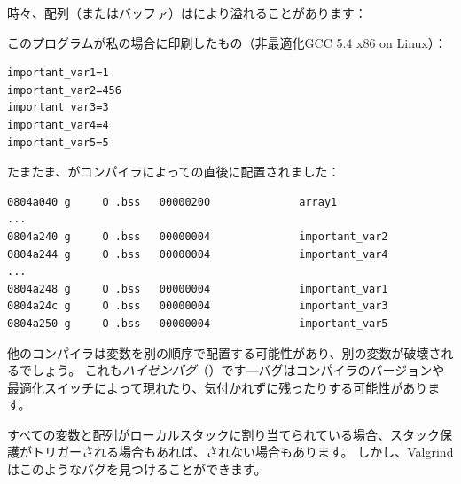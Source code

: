 
時々、配列（またはバッファ）はにより溢れることがあります：



このプログラムが私の場合に印刷したもの（非最適化GCC 5.4 x86 on Linux）：

\begin{lstlisting}
important_var1=1
important_var2=456
important_var3=3
important_var4=4
important_var5=5
\end{lstlisting}

たまたま、がコンパイラによっての直後に配置されました：

\begin{lstlisting}[caption=objdump -x]
0804a040 g     O .bss   00000200              array1
...
0804a240 g     O .bss   00000004              important_var2
0804a244 g     O .bss   00000004              important_var4
...
0804a248 g     O .bss   00000004              important_var1
0804a24c g     O .bss   00000004              important_var3
0804a250 g     O .bss   00000004              important_var5
\end{lstlisting}

他のコンパイラは変数を別の順序で配置する可能性があり、別の変数が破壊されるでしょう。
これも\textit{ハイゼンバグ}（）です---バグはコンパイラのバージョンや最適化スイッチによって現れたり、気付かれずに残ったりする可能性があります。

すべての変数と配列がローカルスタックに割り当てられている場合、スタック保護がトリガーされる場合もあれば、されない場合もあります。
しかし、Valgrindはこのようなバグを見つけることができます。